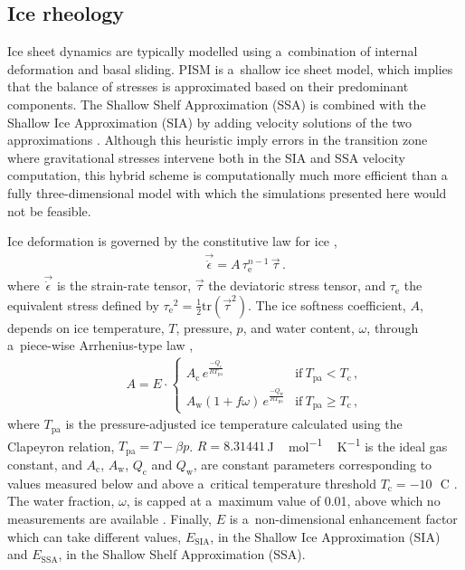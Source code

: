 \documentclass[tc, manuscript]{copernicus}
\begin{document}
\subsection{Ice rheology}
\label{sec:icedyn}

      Ice sheet dynamics are typically modelled using a~combination of
      internal deformation and basal sliding. PISM is a~shallow ice sheet
      model, which implies that the balance of stresses is approximated
      based on their predominant components. The Shallow Shelf Approximation
      (SSA) is combined with the Shallow Ice Approximation
      (SIA) by adding velocity solutions of the two approximations
      \citep[Eqs.~7--9 and 15]{Winkelmann.etal.2011}. Although this
      heuristic imply errors in the transition zone where gravitational
      stresses intervene both in the SIA and SSA velocity computation, this
      hybrid scheme is computationally much more efficient than a fully
      three-dimensional model with which the simulations presented here
      would not be feasible.

      Ice deformation is governed by the constitutive law for ice
      \citep{Glen.1952, Nye.1953},
%
\begin{align}
&\label{eqn:glenslaw}
&\vec{\dot{\epsilon}} = A\,\tau_{\mathrm{e}}^{n-1}\,\vec{\tau} \,.
\end{align}
%
      where $\vec{\dot{\epsilon}}$ is the strain-rate tensor,
      $\vec{\tau}$ the deviatoric stress tensor, and $\tau_{\mathrm{e}}$ the
      equivalent stress defined by ${\tau_{\mathrm{e}}}^2 = \frac{1}{2}
      \mathrm{tr}(\vec{\tau}^2)$. The ice softness coefficient, $A$, depends
      on ice temperature, $T$, pressure, $p$, and water content, $\omega$,
      through a~piece-wise Arrhenius-type law
      \citep[Eqs.~63--65]{Aschwanden.etal.2012},
%
\begin{align}
&\label{eqn:softness}
&A = E\cdot
\begin{cases}
A_{\mathrm{c}} \,e^\frac{-Q_{\mathrm{c}}}{RT_{\text{pa}}}            & \text{if}\ T_{\text{pa}}  <  T_{\mathrm{c}} \,, \\
A_{\mathrm{w}} (1+f\omega)\,e^\frac{-Q_{\mathrm{w}}}{RT_{\text{pa}}} & \text{if}\ T_{\text{pa}} \ge T_{\mathrm{c}} \,,
\end{cases}
\end{align}
%
      where $T_{\text{pa}}$ is the pressure-adjusted ice temperature
      calculated using the Clapeyron relation, ${T_{\text{pa}} = T - \beta
      p}$. $R=8.31441$\,\unit{J\,mol^{-1}\,K^{-1}} is the ideal gas
      constant, and $A_{\mathrm{c}}$, $A_{\mathrm{w}}$, $Q_{\mathrm{c}}$ and
      $Q_{\mathrm{w}}$, are constant parameters corresponding to values
      measured below and above a~critical temperature threshold
      $T_{\mathrm{c}}=-10$\,\unit{{\degree}C}
      \citep[p.~72]{Paterson.Budd.1982,Cuffey.Paterson.2010}. The water
      fraction, $\omega$, is capped at a~maximum value of 0.01, above which
      no measurements are available \citep[Eq.~5.7]{Lliboutry.Duval.1985,
      Greve.1997}. Finally, $E$ is a~non-dimensional enhancement factor
      which can take different values, $E_{\text{SIA}}$, in the Shallow Ice
      Approximation (SIA) and $E_{\text{SSA}}$, in the Shallow Shelf
      Approximation (SSA).
\end{document}
